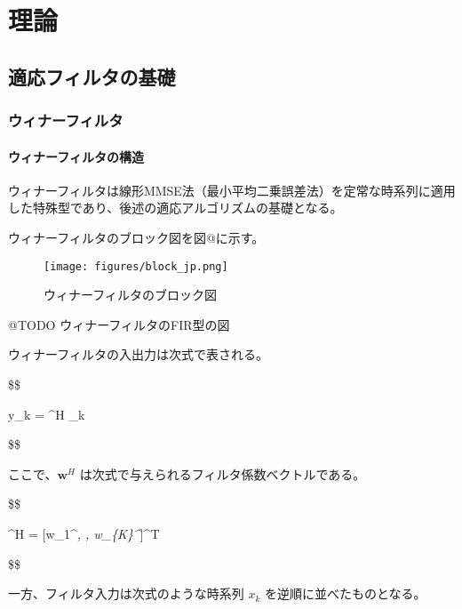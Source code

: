 \hypertarget{ux7406ux8ad6}{%
\section{理論}\label{ux7406ux8ad6}}

\hypertarget{ux9069ux5fdcux30d5ux30a3ux30ebux30bfux306eux57faux790e}{%
\subsection{適応フィルタの基礎}\label{ux9069ux5fdcux30d5ux30a3ux30ebux30bfux306eux57faux790e}}

\hypertarget{ux30a6ux30a3ux30caux30fcux30d5ux30a3ux30ebux30bf}{%
\subsubsection{ウィナーフィルタ}\label{ux30a6ux30a3ux30caux30fcux30d5ux30a3ux30ebux30bf}}

\hypertarget{ux30a6ux30a3ux30caux30fcux30d5ux30a3ux30ebux30bfux306eux69cbux9020}{%
\paragraph{ウィナーフィルタの構造}\label{ux30a6ux30a3ux30caux30fcux30d5ux30a3ux30ebux30bfux306eux69cbux9020}}

ウィナーフィルタは線形MMSE法（最小平均二乗誤差法）を定常な時系列に適用した特殊型であり、後述の適応アルゴリズムの基礎となる。

ウィナーフィルタのブロック図を図@に示す。

\begin{figure}
\centering
\texttt{[image: figures/block\_jp.png]}
\caption{ウィナーフィルタのブロック図}
\end{figure}

@TODO ウィナーフィルタのFIR型の図

ウィナーフィルタの入出力は次式で表される。

\$\$

y\_k = \^{}H \_k

\$\$

ここで、\(\bm{w}^H\) は次式で与えられるフィルタ係数ベクトルである。

\$\$

\^{}H = {[}w\_1\^{}\emph{, \cdots, w\_\{K\}\^{}}{]}\^{}T

\$\$

一方、フィルタ入力は次式のような時系列 \({x_k}\)
を逆順に並べたものとなる。

